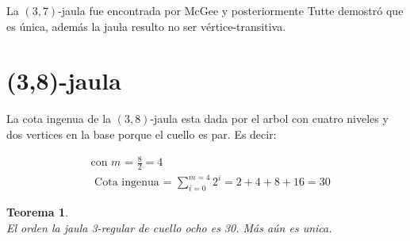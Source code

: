\documentclass[12pt]{book}
\newtheorem{theorem}{Teorema}
\theoremstyle{definition}
\begin{document}
La $(3,7)$-jaula fue encontrada por McGee y posteriormente Tutte
demostró que es única, además la jaula resulto no ser
vértice-transitiva.


\section{(3,8)-jaula}

La cota ingenua de la $(3,8)$-jaula esta dada por el arbol con cuatro
niveles y dos vertices en la base porque el cuello es par. Es decir:

\begin{equation*}
\begin{split}
&\text{con $m$ = } \frac{8}{2} = 4\\
&\text{ Cota ingenua = } \sum^{m=4}_{i=0} 2^i=2+4+8+16=30 
\end{split}
\end{equation*}

\begin{theorem}\textbf{}\\\label{teo(3,8)-jaula}
El orden la jaula 3-regular de cuello ocho es 30. Más aún es unica. 
\end{theorem}
\end{document}
